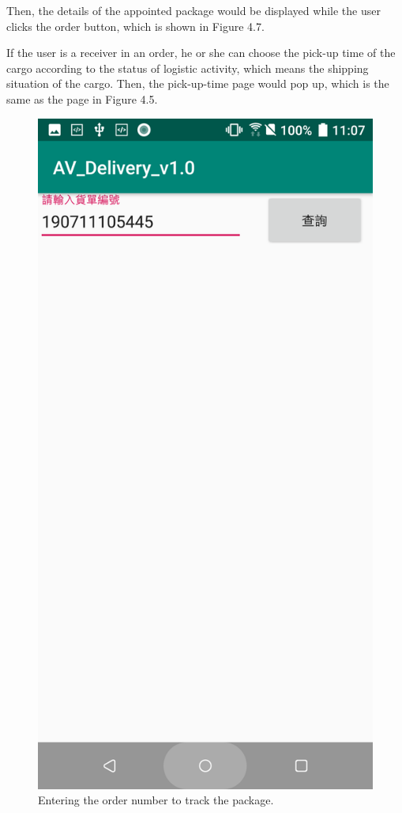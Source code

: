 \documentclass[12pt]{ksthesis}
\begin{document}
\begin{thesis}
{Then, the details of the appointed package would be displayed while the user clicks the order button, which is shown in Figure 4.7. 

If the user is a receiver in an order, he or she can choose the pick-up time of the cargo according to the status of logistic activity, which means the shipping situation of the cargo. Then, the pick-up-time page would pop up, which is the same as the page in Figure 4.5. 

\begin{figure}[H]
\centering
\includegraphics[scale=0.125]{./figures/F4-8-ExamineOrders.PNG}
\caption{\large Entering the order number to track the package.}
\vspace{0.5cm}
\label{Fig:ExamineOrders}
\end{figure} 


}
\end{thesis}
\end{document}
